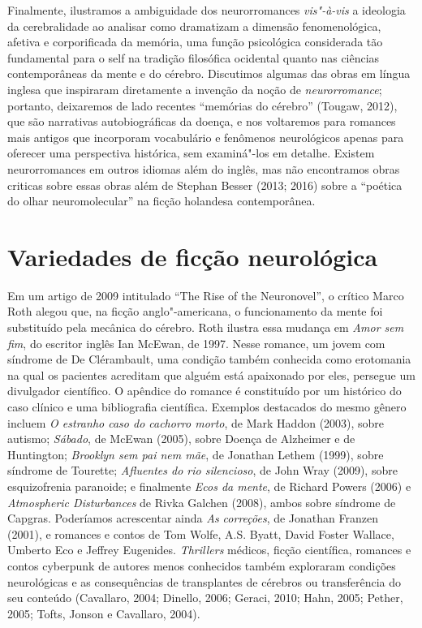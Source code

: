 Finalmente, ilustramos a ambiguidade dos neurorromances \emph{vis"-à-vis}
a ideologia da cerebralidade ao analisar como dramatizam a dimensão
fenomenológica, afetiva e corporificada da memória, uma função
psicológica considerada tão fundamental para o self na tradição
filosófica ocidental quanto nas ciências contemporâneas da mente e do
cérebro. Discutimos algumas das obras em língua inglesa que inspiraram
diretamente a invenção da noção de \emph{neurorromance}; portanto,
deixaremos de lado recentes ``memórias do cérebro'' (Tougaw, 2012), que
são narrativas autobiográficas da doença, e nos voltaremos para romances
mais antigos que incorporam vocabulário e fenômenos neurológicos apenas
para oferecer uma perspectiva histórica, sem examiná"-los em detalhe.
Existem neurorromances em outros idiomas além do inglês, mas não
encontramos obras criticas sobre essas obras além de Stephan Besser
(2013; 2016) sobre a ``poética do olhar neuromolecular'' na ficção
holandesa contemporânea.

\chapter{Variedades de ficção neurológica}

Em um artigo de 2009 intitulado ``The Rise of the Neuronovel'', o
crítico Marco Roth alegou que, na ficção anglo"-americana, o
funcionamento da mente foi substituído pela mecânica do cérebro. Roth
ilustra essa mudança em \emph{Amor sem fim}, do escritor inglês Ian
McEwan, de 1997. Nesse romance, um jovem com síndrome de De Clérambault,
uma condição também conhecida como erotomania na qual os pacientes
acreditam que alguém está apaixonado por eles, persegue um divulgador
científico. O apêndice do romance é constituído por um histórico do caso
clínico e uma bibliografia científica. Exemplos destacados do mesmo
gênero incluem \emph{O estranho caso do cachorro morto}, de Mark Haddon
(2003), sobre autismo; \emph{Sábado}, de McEwan (2005), sobre Doença de
Alzheimer e de Huntington; \emph{Brooklyn sem pai nem mãe}, de Jonathan
Lethem (1999), sobre síndrome de Tourette; \emph{Afluentes do rio
silencioso}, de John Wray (2009), sobre esquizofrenia paranoide; e
finalmente \emph{Ecos da mente}, de Richard Powers (2006) e
\emph{Atmospheric Disturbances} de Rivka Galchen (2008), ambos sobre
síndrome de Capgras. Poderíamos acrescentar ainda \emph{As correções},
de Jonathan Franzen (2001), e romances e contos de Tom Wolfe, A.S.
Byatt, David Foster Wallace, Umberto Eco e Jeffrey Eugenides.
\emph{Thrillers} médicos, ficção científica, romances e contos cyberpunk
de autores menos conhecidos também exploraram condições neurológicas e
as consequências de transplantes de cérebros ou transferência do seu
conteúdo (Cavallaro, 2004; Dinello, 2006; Geraci, 2010; Hahn, 2005;
Pether, 2005; Tofts, Jonson e Cavallaro, 2004).

